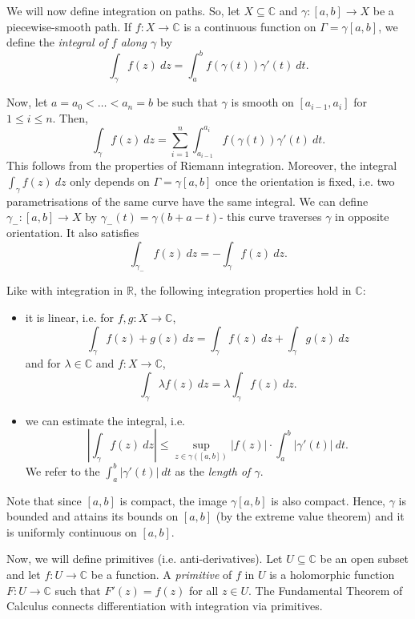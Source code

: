 \documentclass[a4paper, openany]{memoir}
\theoremstyle{definition}
\theoremstyle{plain}
\begin{document}

    We will now define integration on paths. So, let $X \subseteq \mathbb{C}$ and $\gamma \colon [a, b] \to X$ be a piecewise-smooth path. If $f \colon X \to \mathbb{C}$ is a continuous function on $\Gamma = \gamma [a, b]$, we define the \emph{integral of $f$ along $\gamma$} by
    \[\int_\gamma f(z) \ dz = \int_a^b f(\gamma(t)) \gamma'(t) \ dt.\]
    
    Now, let $a = a_0 < \dots < a_n = b$ be such that $\gamma$ is smooth on $[a_{i-1}, a_i]$ for $1 \leq i \leq n$. Then, 
    \[\int_\gamma f(z) \ dz = \sum_{i=1}^n \int_{a_{i-1}}^{a_i} f(\gamma(t)) \gamma'(t) \ dt.\]
    This follows from the properties of Riemann integration. Moreover, the integral $\int_\gamma f(z) \ dz$ only depends on $\Gamma = \gamma [a, b]$ once the orientation is fixed, i.e. two parametrisations of the same curve have the same integral. We can define $\gamma_- \colon [a, b] \to X$ by $\gamma_-(t) = \gamma(b + a - t)$- this curve traverses $\gamma$ in opposite orientation. It also satisfies
    \[\int_{\gamma_-} f(z) \ dz = -\int_\gamma f(z) \ dz.\]

    Like with integration in $\mathbb{R}$, the following integration properties hold in $\mathbb{C}$:
    \begin{itemize}
        \item it is linear, i.e. for $f, g \colon X \to \mathbb{C}$,
        \[\int_\gamma f(z) + g(z) \ dz = \int_\gamma f(z) \ dz + \int_\gamma g(z) \ dz\]
        and for $\lambda \in \mathbb{C}$ and $f \colon X \to \mathbb{C}$,
        \[\int_\gamma \lambda f(z) \ dz = \lambda \int_\gamma f(z) \ dz.\]

        \item we can estimate the integral, i.e.
        \[\left|\int_\gamma f(z) \ dz\right| \leq \sup_{z \in \gamma([a, b])} |f(z)|\cdot \int_a^b |\gamma'(t)| \ dt.\]
        We refer to the $\int_a^b |\gamma'(t)| \ dt$ as the \emph{length of $\gamma$}.
    \end{itemize}
    Note that since $[a, b]$ is compact, the image $\gamma [a, b]$ is also compact. Hence, $\gamma$ is bounded and attains its bounds on $[a, b]$ (by the extreme value theorem) and it is uniformly continuous on $[a, b]$.

    Now, we will define primitives (i.e. anti-derivatives). Let $U \subseteq \mathbb{C}$ be an open subset and let $f \colon U \to \mathbb{C}$ be a function. A \emph{primitive} of $f$ in $U$ is a holomorphic function $F \colon U \to \mathbb{C}$ such that $F'(z) = f(z)$ for all $z \in U$. The Fundamental Theorem of Calculus connects differentiation with integration via primitives.
\end{document}
